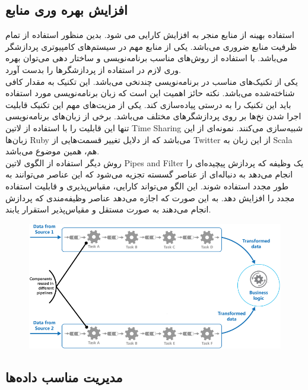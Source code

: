 \subsection{افزایش بهره وری منابع}

استفاده بهینه از منابع منجر به افزایش کارایی می شود. بدین منظور استفاده از تمام ظرفیت منابع ضروری می‌باشد. یکی از منابع مهم در سیستم‌های کامپیوتری پردازشگر می‌باشد. با استفاده از روش‌های مناسب برنامه‌نویسی و ساختار دهی می‌توان بهره وری لازم در استفاده از پردازشگر‌ها را بدست آورد.\\
یکی از تکنیک‌های مناسب در برنامه‌نویسی چند‌نخی  می‌باشد. این تکنیک به مقدار کافی شناخته‌شده می‌باشد. نکته حائز اهمیت این است که زبان برنامه‌نویسی مورد استفاده باید این تکنیک را به درستی پیاده‌سازی کند. یکی از مزیت‌های مهم این تکنیک قابلیت اجرا شدن نخ‌ها بر روی پردازشگر‌های مختلف می‌باشد. برخی از زبان‌های برنامه‌نویسی تنها این قابلیت را با استفاده از ‌لاتین{ Time Sharing } شبیه‌سازی می‌کنند.  نمونه‌ای از این زبان‌ها Ruby می‌باشد که از دلایل تغییر قسمت‌هایی از Twitter از این زبان به Scala هم، همین موضوع می‌باشد.  \\
روش دیگر استفاده‌ از الگوی ‌لاتین{ Pipes and Filter  } یک وظیفه که پردازش پیچیده‌ای را انجام می‌دهد به دنباله‌ای از عناصر گسسته تجزیه می‌شود که این عناصر می‌توانند به طور مجدد استفاده شوند. این الگو می‌تواند کارایی، مقیاس‌پذیری و قابلیت استفاده مجدد را افزایش دهد. به این صورت که اجازه می‌دهد عناصر وظیفه‌مندی که پردازش انجام می‌دهند به صورت مستقل و مقیاس‌پذیر استقرار یابند. 

\begin{figure}[H]
\centering
\includegraphics[scale=.4]{img/pipe-filter.png}

\end{figure}

\subsection{مدیریت مناسب داده‌ها}

